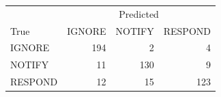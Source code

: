 \begin{tabular}{lrrr}
\toprule
 & \multicolumn{3}{c}{Predicted} \\
True & IGNORE & NOTIFY & RESPOND \\
\midrule
IGNORE & 194 & 2 & 4 \\
NOTIFY & 11 & 130 & 9 \\
RESPOND & 12 & 15 & 123 \\
\bottomrule
\end{tabular}
